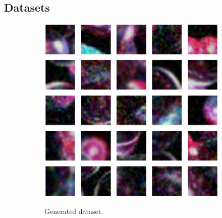 \documentclass[letterpaper]{article} %
\begin{document}
\subsection{Datasets}
\begin{figure}[h!]
\centering
\begin{subfigure}{0.23\textwidth}
\begin{center}
\begin{minipage}[t]{0.95\linewidth}
\begin{centering}
{\includegraphics[width=\linewidth]{frame_samplesxrange.png}}
\caption{Generated dataset.}
\label{fig:frame_dataset}
\end{centering}
\end{minipage}
\end{center}
\end{subfigure}
\begin{subfigure}{0.23\textwidth}
\begin{center}
\begin{minipage}[t]{0.95\linewidth}
\begin{centering}

\end{centering}
\end{minipage}
\end{center}
\end{subfigure}
\end{figure}
\end{document}
